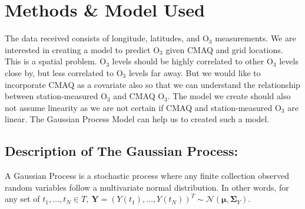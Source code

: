 \documentclass{article}                                                   %
\begin{document}
\section{Methods \& Model Used}
  The data received consists of longitude, latitudes, and O$_3$ measurements.
  We are interested in creating a model to predict O$_3$ given CMAQ and grid 
  locations. This is a spatial problem. O$_3$ levels should be highly correlated 
  to other O$_3$ levels close by, but less correlated to O$_3$ levels far away. 
  But we would like to incorporate CMAQ as a covariate also so that we can
  understand the relationship between station-measured O$_3$ and CMAQ O$_3$.
  The model we create should also not assume linearity as we are not certain if
  CMAQ and station-measured O$_3$ are linear. The Gaussian Process Model can
  help us to created such a model. 

  \subsection{Description of The Gaussian Process:}
  A Gaussian Process is a stochastic process where any finite collection
  observed random variables follow a multivariate normal distribution.
  In other words, for any set of $t_1,\dots,t_N \in T,~\bm{Y} =
  (Y(t_1),\dots,Y(t_N))^T \sim \mathcal{N}(\bm\mu,\bm\Sigma_Y)$.

\end{document}
